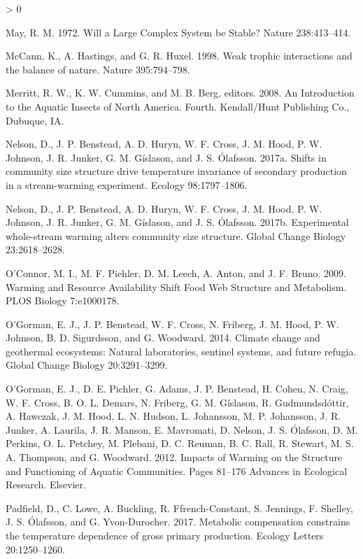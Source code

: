\documentclass[
]{article}
\newlength{\cslhangindent}
\newenvironment{CSLReferences}[2] %
 {%
  \setlength{\parindent}{0pt}
  \ifodd #1 \everypar{\setlength{\hangindent}{\cslhangindent}}\ignorespaces\fi
  \ifnum #2 > 0
  \setlength{\parskip}{#2\baselineskip}
  \fi
 }%
 {}
\begin{document}
\begin{CSLReferences}{1}{0}
\leavevmode\hypertarget{ref-may1972}{}%
May, R. M. 1972. Will a {Large Complex System} be {Stable}? Nature
238:413--414.

\leavevmode\hypertarget{ref-mccann1998}{}%
McCann, K., A. Hastings, and G. R. Huxel. 1998. Weak trophic
interactions and the balance of nature. Nature 395:794--798.

\leavevmode\hypertarget{ref-merritt2008}{}%
Merritt, R. W., K. W. Cummins, and M. B. Berg, editors. 2008. An
{Introduction} to the {Aquatic Insects} of {North America}. Fourth.
{Kendall/Hunt Publishing Co.}, {Dubuque, IA}.

\leavevmode\hypertarget{ref-nelson2017}{}%
Nelson, D., J. P. Benstead, A. D. Huryn, W. F. Cross, J. M. Hood, P. W.
Johnson, J. R. Junker, G. M. Gíslason, and J. S. Ólafsson. 2017a. Shifts
in community size structure drive temperature invariance of secondary
production in a stream-warming experiment. Ecology 98:1797--1806.

\leavevmode\hypertarget{ref-nelson2017a}{}%
Nelson, D., J. P. Benstead, A. D. Huryn, W. F. Cross, J. M. Hood, P. W.
Johnson, J. R. Junker, G. M. Gíslason, and J. S. Ólafsson. 2017b.
Experimental whole-stream warming alters community size structure.
Global Change Biology 23:2618--2628.

\leavevmode\hypertarget{ref-oconnor2009}{}%
O'Connor, M. I., M. F. Piehler, D. M. Leech, A. Anton, and J. F. Bruno.
2009. Warming and {Resource Availability Shift Food Web Structure} and
{Metabolism}. PLOS Biology 7:e1000178.

\leavevmode\hypertarget{ref-ogorman2014}{}%
O'Gorman, E. J., J. P. Benstead, W. F. Cross, N. Friberg, J. M. Hood, P.
W. Johnson, B. D. Sigurdsson, and G. Woodward. 2014. Climate change and
geothermal ecosystems: Natural laboratories, sentinel systems, and
future refugia. Global Change Biology 20:3291--3299.

\leavevmode\hypertarget{ref-ogorman2012}{}%
O'Gorman, E. J., D. E. Pichler, G. Adams, J. P. Benstead, H. Cohen, N.
Craig, W. F. Cross, B. O. L. Demars, N. Friberg, G. M. Gíslason, R.
Gudmundsdóttir, A. Hawczak, J. M. Hood, L. N. Hudson, L. Johansson, M.
P. Johansson, J. R. Junker, A. Laurila, J. R. Manson, E. Mavromati, D.
Nelson, J. S. Ólafsson, D. M. Perkins, O. L. Petchey, M. Plebani, D. C.
Reuman, B. C. Rall, R. Stewart, M. S. A. Thompson, and G. Woodward.
2012. Impacts of {Warming} on the {Structure} and {Functioning} of
{Aquatic Communities}. Pages 81--176 Advances in {Ecological Research}.
{Elsevier}.

\leavevmode\hypertarget{ref-padfield2017}{}%
Padfield, D., C. Lowe, A. Buckling, R. Ffrench-Constant, S. Jennings, F.
Shelley, J. S. Ólafsson, and G. Yvon-Durocher. 2017. Metabolic
compensation constrains the temperature dependence of gross primary
production. Ecology Letters 20:1250--1260.


\end{CSLReferences}
\end{document}
